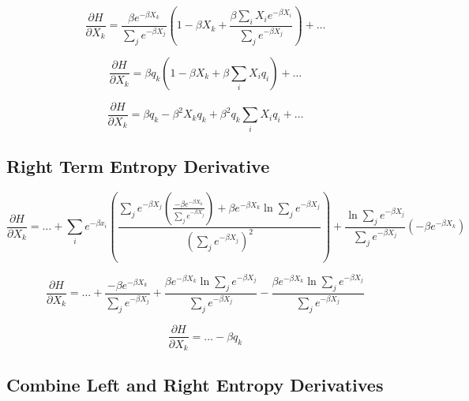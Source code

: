 \begin{displaymath}
    \frac{\partial H}{\partial X_{k}} =
    \frac{\beta e^{-\beta X_{k}}}{\sum_{j}e^{-\beta X_{j}}} \left(1 - \beta X_{k} + \frac{\beta \sum_{i}X_{i}e^{-\beta X_{i}}}{\sum_{j}e^{-\beta X_{j}}}\right)
    + \ldots
\end{displaymath}

\begin{displaymath}
    \frac{\partial H}{\partial X_{k}} = \beta q_{k} \left(1 - \beta X_{k} + \beta \sum_{i}X_{i}q_{i}\right) + \ldots
\end{displaymath}

\begin{displaymath}
    \frac{\partial H}{\partial X_{k}} = \beta q_{k} - \beta^{2}X_{k}q_{k} + \beta^{2}q_{k}\sum_{i}X_{i}q_{i} + \ldots
\end{displaymath}

\subsection{Right Term Entropy Derivative}

\begin{displaymath}
    \frac{\partial H}{\partial X_{k}} = \ldots + 
    \sum_{i}e^{-\beta x_{i}} \left(\frac{\sum_{j}e^{-\beta X_{j}} \left(\frac{-\beta e^{-\beta X_{k}}}{\sum_{j}e^{-\beta X_{j}}}\right)
    + \beta e^{-\beta X_{k}}\ln{\sum_{j}e^{-\beta X_{j}}}}{\left(\sum_{j}e^{-\beta X_{j}}\right)^{2}}\right)
    + \frac{\ln{\sum_{j}e^{-\beta X_{j}}}}{\sum_{j}e^{-\beta X_{j}}}\left(-\beta e^{-\beta X_{k}}\right)
\end{displaymath}

\begin{displaymath}
    \frac{\partial H}{\partial X_{k}} = \ldots + 
    \frac{-\beta e^{-\beta X_{k}}}{\sum_{j}e^{-\beta X_{j}}}
    + \frac{\beta e^{-\beta X_{k}}\ln{\sum_{j}e^{-\beta X_{j}}}}{\sum_{j}e^{-\beta X_{j}}}
    - \frac{\beta e^{-\beta X_{k}} \ln{\sum_{j}e^{-\beta X_{j}}}}{\sum_{j}e^{-\beta X_{j}}}
\end{displaymath}

\begin{equation}
    \frac{\partial H}{\partial X_{k}} = \ldots - \beta q_{k}
\label{rightd}
\end{equation}

\subsection{Combine Left and Right Entropy Derivatives}

